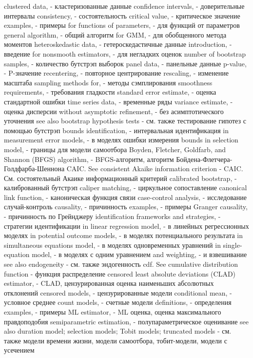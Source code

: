 clustered data, - кластеризованные данные
confidence intervals, - доверительные интервалы
consistency, - состоятельность
critical value, - критическое значение
examples, - примеры
for functions of parameters, - для функций от параметров
general algorithm, - общий алгоритм
for GMM, - для обобщенного метода моментов
heteroskedastic data, - гетероскедастичные данные
introduction, - введение
for nonsmooth estimators, - для негладких оценок
number of bootstrap samples, - количество бутстрэп выборок
panel data, - панельные данные
p-value, - P-значение
recentering, - повторное центрирование
rescaling, - изменение масштаба
sampling methods for, - методы сэмплирования
smoothness requirements, - требования гладкости
standard error estimate, - оценка стандартной ошибки
time series data, - временные ряды
variance estimate, - оценка дисперсии
without asymptotic refinement, - без асимптотического уточнения
see also bootstrap hypothesis tests - см. также тестирование гипотез с помощью бутстрэп
bounds identification, - интервальная идентификация
in measurement error models, - в моделях ошибки измерения
bounds in selection model, - границы для модели самоотбора
Boyden, Fletcher, Goldfarb, and Shannon (BFGS) algorithm, - BFGS-алгоритм, алгоритм Бойдена-Флетчера-Голдфарба-Шеннона
CAIC. See consistent Akaike information criterion - CAIC. См. состоятельный Акаике информационный критерий
calibrated bootstrap, - калиброванный бутстрэп
caliper matching, - циркульное сопоставление
canonical link function, - каноническая функция связи
case-control analysis, - исследование случай-контроль
causality, - причинность
examples, - примеры
Granger causality, - причинность по Грейнджеру
identification frameworks and strategies, - стратегии идентификации
in linear regression model, - в линейных регрессионных моделях
in potential outcome models, - в моделях потенциального результата
in simultaneous equations model, - в моделях одновременных уравнений
in single-equation model, - в моделях с одним уравнением
and weighting, - и взвешивание
see also endogeneity - см. также эндогенность
cdf. See cumulative distribution function - функция распределение
censored least absolute deviations (CLAD) estimator, - CLAD, цензурированная оценка наименьших абсолютных отклонений
censored models, - цензурированные модели
conditional mean, - условное среднее
count models, - счетные модели
definitions, - определения
examples, - примеры
ML estimator, - ML оценка, оценка максимального правдоподобия
semiparametric estimation, - полупараметрическое оценивание
see also duration model; selection models; Tobit models; truncated models - см. также модели времени жизни, модели самоотбора, тобит-модели, модели с усечением
